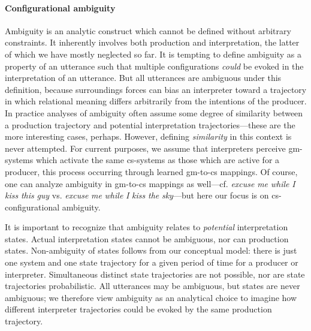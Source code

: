 \paragraph{Configurational ambiguity}

Ambiguity is an analytic construct which cannot be defined without arbitrary constraints. It inherently  involves both production and interpretation, the latter of which we have mostly neglected so far. It is tempting to define ambiguity as a property of an utterance such that multiple configurations \textit{could} be evoked in the interpretation of an utterance. But all utterances are ambiguous under this definition, because surroundings forces can bias an interpreter toward a trajectory in which relational meaning differs arbitrarily from the intentions of the producer. In practice analyses of ambiguity often assume some degree of similarity between a production trajectory and potential interpretation trajectories—these are the more interesting cases, perhaps. However, defining \textit{similarity} in this context is never attempted. For current purposes, we assume that interpreters perceive gm-systems which activate the same cs-systems as those which are active for a producer, this process occurring through learned gm-to-cs mappings. Of course, one can analyze ambiguity in gm-to-cs mappings as well—cf. \textit{excuse} \textit{me} \textit{while} \textit{I} \textit{kiss} \textit{this} \textit{guy} vs. \textit{excuse} \textit{me} \textit{while} \textit{I} \textit{kiss} \textit{the} \textit{sky}—but here our focus is on cs-configurational ambiguity. 

  It is important to recognize that ambiguity relates to \textit{potential} interpretation states. Actual interpretation states cannot be ambiguous, nor can production states. Non-ambiguity of states follows from our conceptual model: there is just one system and one state trajectory for a given period of time for a producer or interpreter. Simultaneous distinct state trajectories are not possible, nor are state trajectories probabilistic. All utterances may be ambiguous, but states are never ambiguous; we therefore view ambiguity as an analytical choice to imagine how different interpreter trajectories could be evoked by the same production trajectory.

